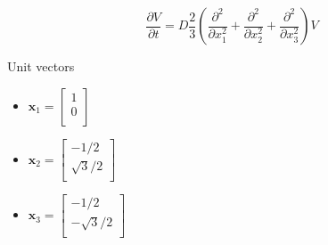 \documentclass{beamer}
\begin{document}
\begin{frame}{}
    \begin{center}
        $$\frac{\partial V}{\partial t} = D\frac{2}{3} \left (\frac{\partial^2}{\partial x^2_1}+\frac{\partial^2}{\partial x^2_2}+\frac{\partial^2}{\partial x^2_3}\right )V$$ 
    \end{center}

Unit vectors 
\begin{itemize}
    \item $\textbf{x}_1=
\left [
    \begin{array}{c}
        1 \\
        0 \\
    \end{array}
\right ]$

    \item $\textbf{x}_2=
\left [
    \begin{array}{c}
        -1/2 \\
        \sqrt{3}/2 \\
    \end{array}
\right ]$

    \item $\textbf{x}_3=
\left [
    \begin{array}{c}
        -1/2 \\
        -\sqrt{3}/2 \\
    \end{array}
\right ]$
\end{itemize}

\end{frame}

\begin{frame}{}
    \begin{center}
    \end{center}
\end{frame}
\end{document}
